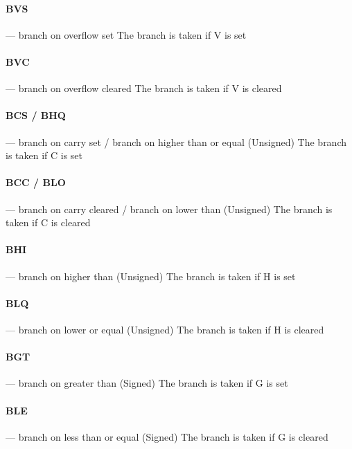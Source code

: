 \documentclass[11pt]{article}
\begin{document}
\paragraph{BVS} --- branch on overflow set\newline
The branch is taken if V is set

\paragraph{BVC} --- branch on overflow cleared\newline
The branch is taken if V is cleared

\paragraph{BCS / BHQ} --- branch on carry set / branch on higher than or equal
(Unsigned)\newline
The branch is taken if C is set

\paragraph{BCC / BLO} --- branch on carry cleared / branch on lower than
(Unsigned)\newline
The branch is taken if C is cleared

\paragraph{BHI} --- branch on higher than (Unsigned)\newline
The branch is taken if H is set

\paragraph{BLQ} --- branch on lower or equal (Unsigned)\newline
The branch is taken if H is cleared

\paragraph{BGT} --- branch on greater than (Signed)\newline
The branch is taken if G is set

\paragraph{BLE} --- branch on less than or equal (Signed)\newline
The branch is taken if G is cleared
\end{document}
